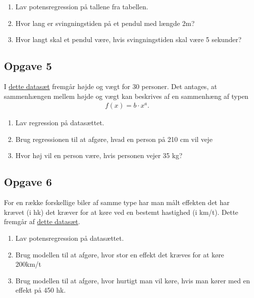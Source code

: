\begin{enumerate}[label=\roman*)]
	\item Lav potensregression på tallene fra tabellen. 
	\item Hvor lang er svingningstiden på et pendul med længde 2m?
	\item Hvor langt skal et pendul være, hvis svingningstiden skal være 5 sekunder?
\end{enumerate}


\subsection*{Opgave 5}
I \href{https://github.com/ChristianJLex/TeachingNotes/raw/master/2023-2024/Data%20og%20lign/H%C3%B8jdeV%C3%A6gt.xlsx}{\color{blue!60} dette datasæt} fremgår højde og vægt for 30 personer. Det antages, at sammenhængen mellem højde og vægt kan beskrives af en sammenhæng af typen
\begin{align*}
	f(x) = b \cdot x^a.
\end{align*}

\begin{enumerate}[label=\roman*)]
	\item Lav regression på datasættet.
	\item Brug regressionen til at afgøre, hvad en person på 210 cm vil veje
	\item Hvor høj vil en person være, hvis personen vejer 35 kg?
\end{enumerate}

\subsection*{Opgave 6}
For en række forskellige biler af samme type har man målt effekten det har krævet (i hk) det kræver for at køre ved en bestemt hastighed (i km/t). Dette fremgår af \href{https://github.com/ChristianJLex/TeachingNotes/raw/master/2023-2024/Data og lign/hk.xlsx}{\color{blue!60} dette datasæt}.

\begin{enumerate}[label=\roman*)]
	\item Lav potensregression på datasættet.
	\item Brug modellen til at afgøre, hvor stor en effekt det kræves for at køre 200km/t
	\item Brug modellen til at afgøre, hvor hurtigt man vil køre, hvis man kører med en effekt 
	på 450 hk.
\end{enumerate}

